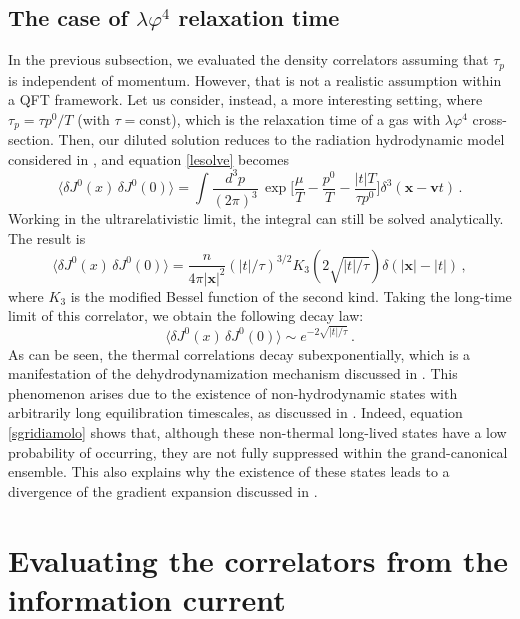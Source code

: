 \documentclass[aps,prd,preprint,nofootinbib,amsmath,amssymb,showpacs,longbibliography,singlecolumn,superscriptaddress,10pt]{revtex4-1}
\theoremstyle{plain}
\theoremstyle{definition}
\begin{document}
\subsection{The case of $\lambda \varphi^4$ relaxation time}

In the previous subsection, we evaluated the density correlators assuming that $\tau_p$ is independent of momentum. However, that is not a realistic assumption within a QFT framework. Let us consider, instead, a more interesting setting, where $\tau_p{=}\tau p^0/T$ (with $\tau{=}\text{const}$), which is the relaxation time of a gas with $\lambda \varphi^4$ cross-section. Then, our diluted solution reduces to the radiation hydrodynamic model considered in \cite{Gavassino:2024pgl}, and equation \eqref{lesolve} becomes
\begin{equation}\label{lesolve39}
    \langle \delta J^0(x) \, \delta J^0(0)\rangle = \int \dfrac{d^3p}{(2\pi)^3}  \, \exp \bigg[\dfrac{\mu}{T}{-}\dfrac{p^0}{T}{-}\dfrac{|t|T}{\tau p^0}\bigg] \delta^3(\textbf{x}-\textbf{v}t) \, .
\end{equation}
Working in the ultrarelativistic limit, the integral can still be solved analytically. The result is
\begin{equation}
\langle \delta J^0(x) \, \delta J^0(0)\rangle = \dfrac{n}{4\pi |\textbf{x}|^2} (|t|/\tau)^{3/2} K_3(2\sqrt{|t|/\tau}) \delta(|\textbf{x}|-|t|) \, ,
\end{equation}
where $K_3$ is the modified Bessel function of the second kind. Taking the long-time limit of this correlator, we obtain the following decay law:
\begin{equation}\label{sgridiamolo}
\langle \delta J^0(x) \, \delta J^0(0)\rangle \sim  e^{-2\sqrt{|t|/\tau}} \, .
\end{equation}
As can be seen, the thermal correlations decay subexponentially, which is a manifestation of the dehydrodynamization mechanism discussed in \cite{Kurkela:2017xis}. This phenomenon arises due to the existence of non-hydrodynamic states with arbitrarily long equilibration timescales, as discussed in \cite{Gavassino:2024rck,Rocha:2024cge}. Indeed, equation \eqref{sgridiamolo} shows that, although these non-thermal long-lived states have a low probability of occurring, they are not fully suppressed within the grand-canonical ensemble. This also explains why the existence of these states leads to a divergence of the gradient expansion discussed in \cite{Gavassino:2024pgl}.



\section{Evaluating the correlators from the information current}
\end{document}
